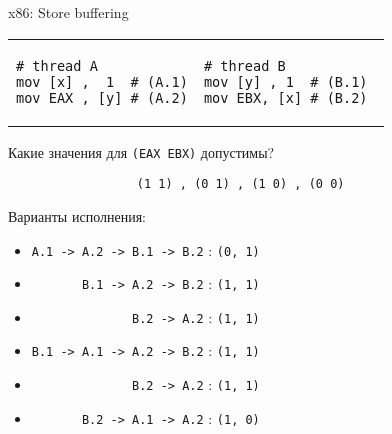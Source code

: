 \begin{frame}{x86: Store buffering}

\begin{tabular}{p{} p{}}
\begin{verbatim}
# thread A
mov [x] ,  1  # (A.1)
mov EAX , [y] # (A.2)
\end{verbatim}

& 

\begin{verbatim}
# thread B          
mov [y] , 1  # (B.1) 
mov EBX, [x] # (B.2) 
\end{verbatim}
\end{tabular}

Какие значения для \texttt{(EAX EBX)} допустимы?

\texttt{\ \ \ \ \ \ \ \ \ \ \ \ \ \ \ \ \ \ (1 1)\ , (0 1)\ , (1 0)\ , (0 0)}

Варианты исполнения:
\begin{itemize}
    \item \texttt{A.1 -> A.2 -> B.1 -> B.2}                            : \texttt{(0, 1)}
    \item \texttt{\ \ \ \ \ \ \       B.1 -> A.2 -> B.2}               : \texttt{(1, 1)}
    \item \texttt{\ \ \ \ \ \ \ \ \ \ \ \ \ \              B.2 -> A.2} : \texttt{(1, 1)}
    \item \texttt{B.1 -> A.1 -> A.2 -> B.2}                            : \texttt{(1, 1)}
    \item \texttt{\ \ \ \ \ \ \ \ \ \ \ \ \ \              B.2 -> A.2} : \texttt{(1, 1)}
    \item \texttt{\ \ \ \ \ \ \       B.2 -> A.1 -> A.2}               : \texttt{(1, 0)}
\end{itemize}
\end{frame}

